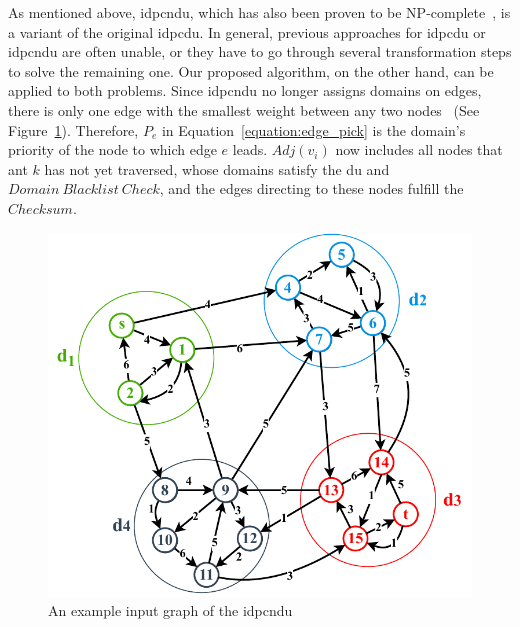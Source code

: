 As mentioned above, \acrshort{idpcndu}, which has also been proven to be NP-complete~\cite{maggi2018domain}, is a variant of the original \gls{idpcdu}. In general, previous approaches for \gls{idpcdu} or \acrshort{idpcndu} are often unable, or they have to go through several transformation steps to solve the remaining one. Our proposed algorithm, on the other hand, can be applied to both problems. Since \acrshort{idpcndu} no longer assigns domains on edges, there is only one edge with the smallest weight between any two nodes~\cite{binh2021two} (See Figure~\ref{fig:idpc-ndu-example}). Therefore, $P_e$ in Equation~\ref{equation:edge_pick} is the domain's priority of the node to which edge $e$ leads. $Adj(v_i)$ now includes all nodes that ant $k$ has not yet traversed, whose domains satisfy the \gls{du} and $Domain~Blacklist~Check$, and the edges directing to these nodes fulfill the $Checksum$.

\setlength{\intextsep}{3pt}
\renewcommand{\scalefigure}{.9}
\begin{figure}[htbp]
	\centering
	\includegraphics[scale=\scalefigure]{Figures/chap 3/IDPC-NDU.pdf}
	\caption{An example input graph of the \gls{idpcndu}}
	\label{fig:idpc-ndu-example}
\end{figure}